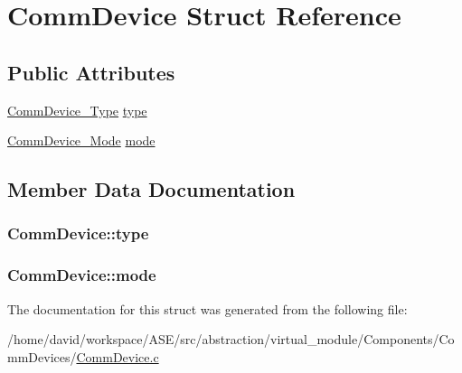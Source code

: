 \hypertarget{structCommDevice}{
\section{CommDevice Struct Reference}
\label{structCommDevice}
}
\subsection*{Public Attributes}
\begin{CompactItemize}
\item 
\hyperlink{CommDevice_8h_7234d6c0f8c210e152be26ad72fce0bd}{CommDevice\_\-Type} \hyperlink{structCommDevice_2bb0ed45bb0b5c02e8271632d376f4ec}{type}
\item 
\hyperlink{CommDevice_8h_d5ea749c29a04e83eb5f4835a52a87cd}{CommDevice\_\-Mode} \hyperlink{structCommDevice_8279c819ef09efcdb796e0e64cd4c9c8}{mode}
\end{CompactItemize}


\subsection{Member Data Documentation}
\hypertarget{structCommDevice_2bb0ed45bb0b5c02e8271632d376f4ec}{
\subsubsection{ {\bf CommDevice::type}}}
\label{structCommDevice_2bb0ed45bb0b5c02e8271632d376f4ec}


\hypertarget{structCommDevice_8279c819ef09efcdb796e0e64cd4c9c8}{
\subsubsection{ {\bf CommDevice::mode}}}
\label{structCommDevice_8279c819ef09efcdb796e0e64cd4c9c8}




The documentation for this struct was generated from the following file:\begin{CompactItemize}
\item 
/home/david/workspace/ASE/src/abstraction/virtual\_\-module/Components/CommDevices/\hyperlink{CommDevice_8c}{CommDevice.c}\end{CompactItemize}
